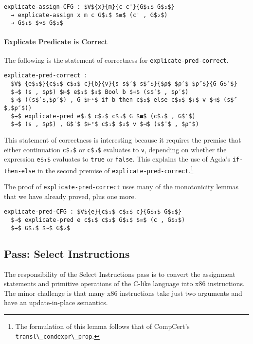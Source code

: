 \documentclass[sigplan,review,dvipsnames,screen,10pt]{acmart}
\begin{document}
\begin{lstlisting}
explicate-assign-CFG : $∀${x}{m}{c c'}{G$₁$ G$₂$}
  → explicate-assign x m c G$₁$ $≡$ (c' , G$₂$)
  → G$₁$ $↝$ G$₂$
\end{lstlisting}

\paragraph{Explicate Predicate is Correct}

The following is the statement of correctness for
\lstinline{explicate-pred-correct}.

\begin{lstlisting}
explicate-pred-correct :
  $∀$ {e$₁$}{c$₁$ c$₂$ c}{b}{v}{s s$′$ s$″$}{$ρ$ $ρ′$ $ρ″$}{G G$′$}
  $→$ (s , $ρ$) $⊢$ e$₁$ $⇓$ Bool b $⊣$ (s$′$ , $ρ′$)
  $→$ ((s$′$,$ρ′$) , G $⊢ᶜ$ if b then c$₂$ else c$₃$ $⇓$ v $⊣$ (s$″$,$ρ″$))
  $→$ explicate-pred e$₁$ c$₂$ c$₃$ G $≡$ (c$₁$ , G$′$)
  $→$ (s , $ρ$) , G$′$ $⊢ᶜ$ c$₁$ $⇓$ v $⊣$ (s$″$ , $ρ″$)
\end{lstlisting}

\noindent This statement of correctness is interesting because it
requires the premise that either continuation \lstinline{c$₂$} or
\lstinline{c$₃$} evaluates to \lstinline{v}, depending on whether the
expression \lstinline{e$₁$} evaluates to \lstinline{true} or
\lstinline{false}. This explains the use of Agda's
\lstinline{if-then-else} in the second premise of
\lstinline{explicate-pred-correct}.\footnote{The formulation of this
lemma follows that of CompCert's \lstinline{transl\_condexpr\_prop}.}

The proof of \lstinline{explicate-pred-correct} uses many of the
monotonicity lemmas that we have already proved, plus one more.

\begin{lstlisting}
explicate-pred-CFG : $∀${e}{c$₁$ c$₂$ c}{G$₁$ G$₂$}
  $→$ explicate-pred e c$₁$ c$₂$ G$₁$ $≡$ (c , G$₂$)
  $→$ G$₁$ $↝$ G$₂$
\end{lstlisting}

\subsection{Pass: Select Instructions}

The responsibility of the Select Instructions pass is to convert the
assignment statements and primitive operations of the C-like language
into x86 instructions. The minor challenge is that many x86
instructions take just two arguments and have an update-in-place
semantics.
\end{document}
